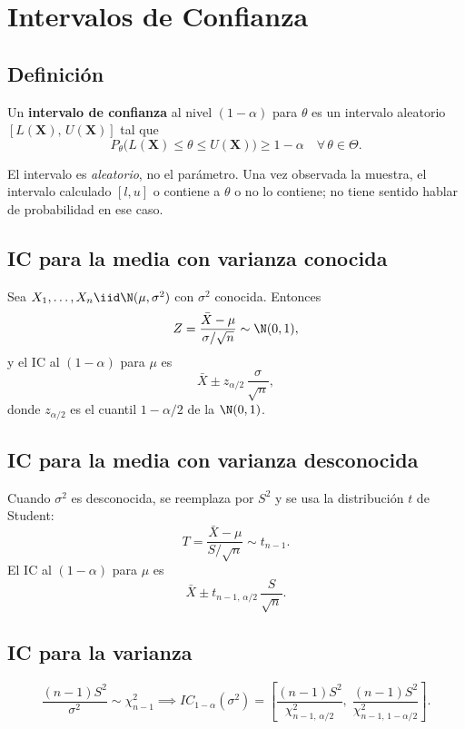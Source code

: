 \section{Intervalos de Confianza}

\subsection{Definición}

\begin{defi}
  Un \textbf{intervalo de confianza} al nivel $(1-\alpha)$ para $\theta$ es
  un intervalo aleatorio $[L(\mathbf{X}),\, U(\mathbf{X})]$ tal que
  \[
    P_\theta\bigl(L(\mathbf{X}) \leq \theta \leq U(\mathbf{X})\bigr)
    \geq 1 - \alpha \quad \forall\, \theta \in \Theta.
  \]
\end{defi}

\begin{cuidado}
  El intervalo es \emph{aleatorio}, no el parámetro. Una vez observada la
  muestra, el intervalo calculado $[l, u]$ o contiene a $\theta$ o no lo
  contiene; no tiene sentido hablar de probabilidad en ese caso.
\end{cuidado}

\subsection{IC para la media con varianza conocida}

Sea $X_1,\ldots,X_n \iid \N(\mu, \sigma^2)$ con $\sigma^2$ conocida. Entonces
\[
  Z = \frac{\bar{X} - \mu}{\sigma/\sqrt{n}} \sim \N(0,1),
\]
y el IC al $(1-\alpha)$ para $\mu$ es
\[
  \bar{X} \pm z_{\alpha/2}\,\frac{\sigma}{\sqrt{n}},
\]
donde $z_{\alpha/2}$ es el cuantil $1-\alpha/2$ de la $\N(0,1)$.

\subsection{IC para la media con varianza desconocida}

Cuando $\sigma^2$ es desconocida, se reemplaza por $S^2$ y se usa la
distribución $t$ de Student:
\[
  T = \frac{\bar{X} - \mu}{S/\sqrt{n}} \sim t_{n-1}.
\]
El IC al $(1-\alpha)$ para $\mu$ es
\[
  \bar{X} \pm t_{n-1,\,\alpha/2}\,\frac{S}{\sqrt{n}}.
\]

\subsection{IC para la varianza}

\[
  \frac{(n-1)S^2}{\sigma^2} \sim \chi^2_{n-1}
  \implies
  IC_{1-\alpha}(\sigma^2) =
  \left[
    \frac{(n-1)S^2}{\chi^2_{n-1,\,\alpha/2}},\;
    \frac{(n-1)S^2}{\chi^2_{n-1,\,1-\alpha/2}}
  \right].
\]
